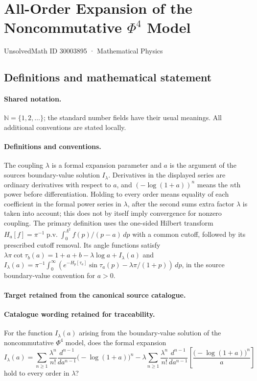 \documentclass[11pt]{article}
\begin{document}
\setcounter{section}{30003894}
\section{All-Order Expansion of the Noncommutative $\Phi^4$ Model}\label{30003895}
{\small UnsolvedMath ID 30003895 · Mathematical Physics}
\subsection{Definitions and mathematical statement}

\paragraph{Shared notation.}$\mathbb N=\{1,2,\ldots\}$; the standard number fields have their usual meanings. All additional conventions are stated locally.


\paragraph{Definitions and conventions.}
The coupling $\lambda$ is a formal expansion parameter and $a$ is the argument of the source\textquotesingle s boundary-value solution $I_\lambda$. Derivatives in the displayed series are ordinary derivatives with respect to $a$, and $(-\log(1+a))^n$ means the $n$th power before differentiation. Holding to every order means equality of each coefficient in the formal power series in $\lambda$, after the second sum\textquotesingle s extra factor $\lambda$ is taken into account; this does not by itself imply convergence for nonzero coupling. The primary definition uses the one-sided Hilbert transform $H_a[f]=\pi^{-1}\operatorname{p.v.}\int_0^{\Lambda^2}f(p)/(p-a)\,dp$ with a common cutoff, followed by its prescribed cutoff removal. Its angle functions satisfy $\lambda\pi\cot\tau_b(a)=1+a+b-\lambda\log a+I_\lambda(a)$ and $I_\lambda(a)=\pi^{-1}\int_0^\infty(e^{-H_p[\tau_a]}\sin\tau_a(p)-\lambda\pi/(1+p))\,dp$, in the source boundary-value convention for $a>0$.

\paragraph{Target retained from the canonical source catalogue.}
\paragraph{Catalogue wording retained for traceability.}
For the function $I_\lambda(a)$ arising from the boundary-value solution of the noncommutative $\Phi^4$ model, does the formal expansion
$$
I_\lambda(a)=\sum_{n\geq1}\frac{\lambda^n}{n!}\frac{d^{n-1}}{da^{n-1}}\bigl(-\log(1+a)\bigr)^n
-\lambda\sum_{n\geq1}\frac{\lambda^n}{n!}\frac{d^{n-1}}{da^{n-1}}\left[\frac{\bigl(-\log(1+a)\bigr)^n}{a}\right]
$$
hold to every order in $\lambda$?
\end{document}
